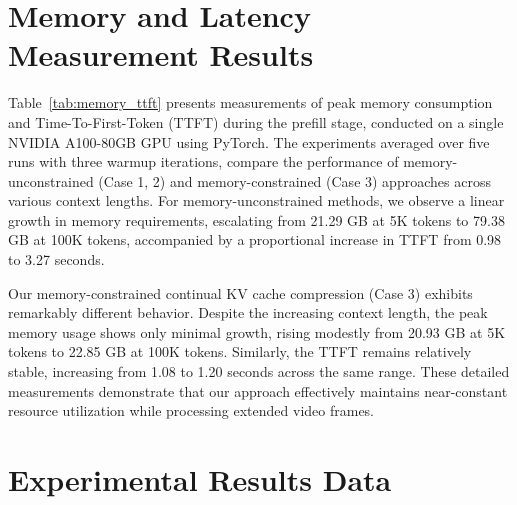 \section{Memory and Latency Measurement Results}\label{appn:memory_latency}

Table~\ref{tab:memory_ttft} presents measurements of peak memory consumption and Time-To-First-Token (TTFT) during the prefill stage, conducted on a single NVIDIA A100-80GB GPU using PyTorch. The experiments averaged over five runs with three warmup iterations, compare the performance of memory-unconstrained (Case 1, 2) and memory-constrained (Case 3) approaches across various context lengths. For memory-unconstrained methods, we observe a linear growth in memory requirements, escalating from 21.29 GB at 5K tokens to 79.38 GB at 100K tokens, accompanied by a proportional increase in TTFT from 0.98 to 3.27 seconds.

Our memory-constrained continual KV cache compression (Case 3) exhibits remarkably different behavior. Despite the increasing context length, the peak memory usage shows only minimal growth, rising modestly from 20.93 GB at 5K tokens to 22.85 GB at 100K tokens. Similarly, the TTFT remains relatively stable, increasing from 1.08 to 1.20 seconds across the same range. These detailed measurements demonstrate that our approach effectively maintains near-constant resource utilization while processing extended video frames.



\section{Experimental Results Data}



